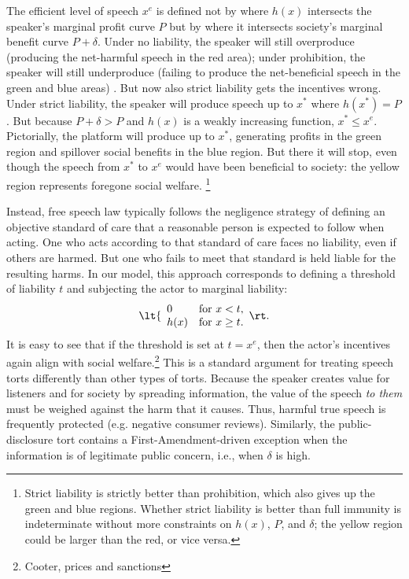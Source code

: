 The efficient level of speech $x^e$ is defined not by where $h(x)$ intersects the speaker's marginal profit curve $P$ but by where it intersects society's marginal benefit curve $P+\delta$. Under no liability, the speaker will still overproduce (producing the net-harmful speech in the red area); under prohibition, the speaker will still underproduce (failing to produce the net-beneficial speech in the green and blue areas) . But now also strict liability gets the incentives wrong. Under strict liability, the speaker will produce speech up to $x^*$ where $h(x^*) = P$. But because $P + \delta > P$ and $h(x)$ is a weakly increasing function, $x^* \le x^e$. Pictorially, the platform will produce up to $x^*$, generating profits in the green region and spillover social benefits in the blue region. But there it will stop, even though the speech from $x^*$ to $x^e$ would have been beneficial to society: the yellow region represents foregone social welfare. \footnote{Strict liability is strictly better than prohibition, which also gives up the green and blue regions. Whether strict liability is better than full immunity is indeterminate without more constraints on $h(x)$, $P$, and $\delta$; the yellow region could be larger than the red, or vice versa.}

Instead, free speech law typically follows the negligence strategy of defining an objective standard of care that a reasonable person is expected to follow when acting. One who acts according to that standard of care faces no liability, even if others are harmed. But one who fails to meet that standard is held liable for the resulting harms. In our model, this approach corresponds to defining a threshold of liability $t$ and subjecting the actor to marginal liability:
\begin{equation}
\lt\{\begin{array}{ll}
    0 & \mbox{for $x <t$}, \\
    h(x) & \mbox{for $x \ge t$}.
\end{array}\rt.
\end{equation}
It is easy to see that if the threshold is set at $t=x^e$, then the actor's incentives again align with social welfare.\footnote{Cooter, prices and sanctions} This is a standard argument for treating speech torts differently than other types of torts. Because the speaker creates value for listeners and for society by spreading information, the value of the speech \emph{to them} must be weighed against the harm that it causes. Thus, harmful true speech is frequently protected (e.g. negative consumer reviews). Similarly, the public-disclosure tort contains a First-Amendment-driven exception when the information is of legitimate public concern, i.e., when $\delta$ is high.

